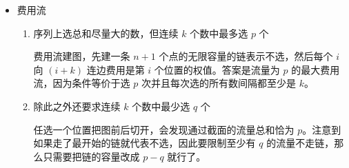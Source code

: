 \begin{itemize}








\item 费用流

\begin{enumerate}

\item 序列上选总和尽量大的数，但连续 $k$ 个数中最多选 $p$ 个

费用流建图，先建一条 $n+1$ 个点的无限容量的链表示不选，然后每个 $i$ 向 $(i + k)$ 连边费用是第 $i$ 个位置的权值。答案是流量为 $p$ 的最大费用流，因为条件等价于选 $p$ 次并且每次选的所有数间隔都至少是 $k$。

\item 除此之外还要求连续 $k$ 个数中最少选 $q$ 个

任选一个位置把图前后切开，会发现通过截面的流量总和恰为 $p$。注意到如果走了最开始的链就代表不选，因此要限制至少有 $q$
的流量不走链，那么只需要把链的容量改成 $p - q$ 就行了。

\end{enumerate}

\end{itemize}
